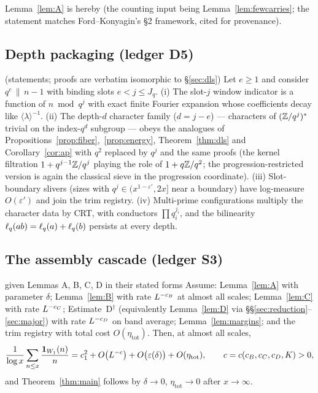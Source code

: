 \noindent Lemma~\ref{lem:A} is hereby \statusP{} (the counting input
being Lemma~\ref{lem:fewcarries}; the statement matches
Ford--Konyagin's \S2 framework, cited for provenance).

\subsection{Depth packaging (ledger D5)}

\begin{proposition}\label{prop:depth}
\statusP{} (statements; proofs are verbatim isomorphic to \S\ref{sec:dls})
\quad
Let $e\ge1$ and consider $q^{e}\,\|\,n-1$ with binding slots
$e<j\le J_q$. (i) The slot-$j$ window indicator is a function of
$n\bmod q^{j}$ with exact finite Fourier expansion whose coefficients
decay like $\langle\lambda\rangle^{-1}$. (ii) The depth-$d$ character
family ($d=j-e$) --- characters of $(\mathbb{Z}/q^{j})^*$ trivial on the
index-$q^{d}$ subgroup --- obeys the analogues of
Propositions~\ref{prop:fiber},~\ref{prop:energy},
Theorem~\ref{thm:dls} and Corollary~\ref{cor:ap} with $q^{2}$ replaced
by $q^{j}$ and the same proofs (the kernel filtration
$1+q^{j-1}\mathbb{Z}/q^{j}$ playing the role of $1+q\mathbb{Z}/q^{2}$; the
progression-restricted version is again the classical sieve in the
progression coordinate). (iii) Slot-boundary slivers (sizes with
$q^{j}\in(x^{1-\varepsilon'},2x]$ near a boundary) have log-measure
$O(\varepsilon')$ and join the trim registry. (iv) Multi-prime
configurations multiply the character data by CRT, with conductors
$\prod q_i^{j_i}$, and the bilinearity
$\ell_q(ab)=\ell_q(a)+\ell_q(b)$ persists at every depth.
\end{proposition}

\subsection{The assembly cascade (ledger S3)}

\begin{proposition}[composition of A--D]\label{prop:cascade}
\statusP{} given Lemmas A, B, C, D in their stated forms\quad
Assume: Lemma~\ref{lem:A} with parameter $\delta$; Lemma~\ref{lem:B}
with rate $L^{-c_B}$ at almost all scales;
Lemma~\ref{lem:C} with rate $L^{-c_C}$; Estimate~D$^\dagger$
(equivalently Lemma~\ref{lem:D} via
\S\S\ref{sec:reduction}--\ref{sec:major}) with rate $L^{-c_D}$ on
band average; Lemma~\ref{lem:margins}; and the trim registry with
total cost $O(\eta_{\mathrm{tot}})$. Then, at almost all scales,
\[
\frac1{\log x}\sum_{n\le x}\frac{\mathbf 1_{W_1}(n)}{n}
=c_1^{2}+O\big(L^{-c}\big)+O\big(\varepsilon(\delta)\big)
+O(\eta_{\mathrm{tot}}),\qquad c=c(c_B,c_C,c_D,K)>0,
\]
and Theorem~\ref{thm:main} follows by $\delta\to0$,
$\eta_{\mathrm{tot}}\to0$ after $x\to\infty$.
\end{proposition}

